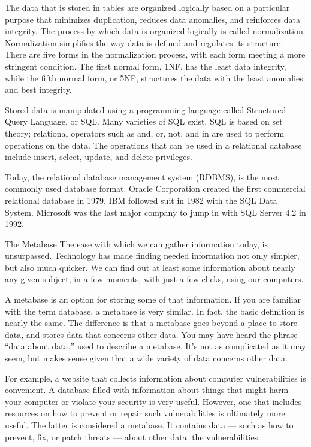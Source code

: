  

The data that is stored in tables are organized logically based on a particular purpose that minimizes duplication, reduces data anomalies, and reinforces data integrity. The process by which data is organized logically is called normalization. Normalization simplifies the way data is defined and regulates its structure. There are five forms in the normalization process, with each form meeting a more stringent condition. The first normal form, 1NF, has the least data integrity, while the fifth normal form, or 5NF, structures the data with the least anomalies and best integrity.


 

Stored data is manipulated using a programming language called Structured Query Language, or SQL. Many varieties of SQL exist. SQL is based on set theory; relational operators such as and, or, not, and in are used to perform operations on the data. The operations that can be used in a relational database include insert, select, update, and delete privileges.


 

Today, the relational database management system (RDBMS), is the most commonly used database format. Oracle Corporation created the first commercial relational database in 1979. IBM followed suit in 1982 with the SQL Data System. Microsoft was the last major company to jump in with SQL Server 4.2 in 1992.

The Metabase
The ease with which we can gather information today, is unsurpassed. Technology has made finding needed information not only simpler, but also much quicker. We can find out at least some information about nearly any given subject, in a few moments, with just a few clicks, using our computers.
 
A metabase is an option for storing some of that information. If you are familiar with the term database, a metabase is very similar. In fact, the basic definition is nearly the same. The difference is that a metabase goes beyond a place to store data, and stores data that concerns other data. You may have heard the phrase “data about data,” used to describe a metabase. It’s not as complicated as it may seem, but makes sense given that a wide variety of data concerns other data.
 
For example, a website that collects information about computer vulnerabilities is convenient. A database filled with information about things that might harm your computer or violate your security is very useful. However, one that includes resources on how to prevent or repair such vulnerabilities is ultimately more useful. The latter is considered a metabase. It contains data — such as how to prevent, fix, or patch threats — about other data: the vulnerabilities.
 

